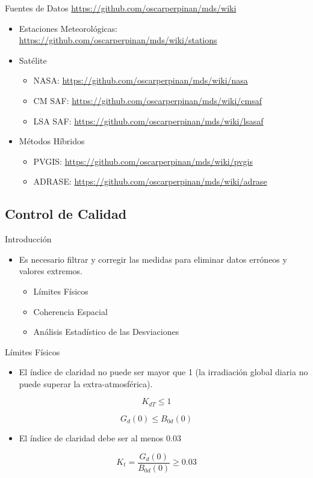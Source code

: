 \documentclass[xcolor={usenames,svgnames,dvipsnames}]{beamer}
\begin{document}
\begin{frame}[label={sec:org1722d23}]{Fuentes de Datos}
\url{https://github.com/oscarperpinan/mds/wiki}

\begin{itemize}
\item Estaciones Meteorológicas: \url{https://github.com/oscarperpinan/mds/wiki/stations}
\item Satélite
\begin{itemize}
\item NASA: \url{https://github.com/oscarperpinan/mds/wiki/nasa}
\item CM SAF: \url{https://github.com/oscarperpinan/mds/wiki/cmsaf}
\item LSA SAF: \url{https://github.com/oscarperpinan/mds/wiki/lsasaf}
\end{itemize}

\item Métodos Híbridos
\begin{itemize}
\item PVGIS: \url{https://github.com/oscarperpinan/mds/wiki/pvgis}
\item ADRASE: \url{https://github.com/oscarperpinan/mds/wiki/adrase}
\end{itemize}
\end{itemize}
\end{frame}

\subsection{Control de Calidad}
\label{sec:org42fb61d}
\begin{frame}[label={sec:orga0420d4}]{Introducción}
\begin{itemize}
\item Es necesario filtrar y corregir las medidas para eliminar datos erróneos y valores extremos.
\begin{itemize}
\item Límites Físicos
\item Coherencia Espacial
\item Análisis Estadístico de las Desviaciones
\end{itemize}
\end{itemize}
\end{frame}

\begin{frame}[label={sec:org3827907}]{Límites Físicos}
\begin{itemize}
\item El índice de claridad no puede ser mayor que 1 (la irradiación global diaria no puede superar la extra-atmosférica).
\end{itemize}
\[
  K_{dT} \leq 1
\]

\[
G_d(0) \leq B_{0d}(0)
\]

\begin{itemize}
\item El índice de claridad debe ser al menos 0.03
\end{itemize}
\[
K_t = \frac{G_d(0)}{B_{0d}(0)} \geq 0.03
\]
\end{frame}
\end{document}
